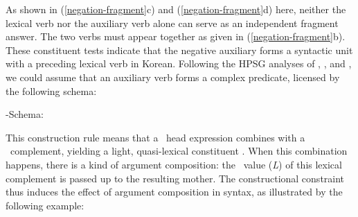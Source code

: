 \documentclass[output=paper
                ,modfonts
                ,nonflat
	        ,collection
	        ,collectionchapter
	        ,collectiontoclongg
 	        ,biblatex
                ,babelshorthands
                ,newtxmath
                ,draftmode
                ,colorlinks, citecolor=brown
]{./langsci/langscibook}
\begin{document}
{\begin{exe}
\begin{xlist}
\begin{exe}
\begin{xlist}
%
%
%
%
As shown in (\ref{negation-fragment}c) and (\ref{negation-fragment}d) here, neither the lexical verb nor the auxiliary verb alone can serve as an independent fragment answer. The two
verbs must appear together as given in (\ref{negation-fragment}b). These constituent tests
indicate that the negative auxiliary forms
a syntactic unit with a preceding lexical  verb in Korean.
Following the HPSG analyses of \citet{Bratt:96}, \citet{Chung:98}, and \citet{Kim:16},
we could assume that
an auxiliary verb forms a complex predicate, licensed by
the following schema:
%
%


\ea
\label{negation-hd-lex-cxt}
\head-\LIGHT Schema:\\
\z

\noindent   This construction rule means that a \LIGHT\ head
expression combines with a \LIGHT\ complement, yielding
a light, quasi-lexical constituent \citep{BW:13}.
When this combination happens,
there is a kind of argument composition: the \COMPS\  value (\textit{L}) of this
lexical complement is passed up to the resulting mother.
The constructional constraint thus induces the effect of argument composition in syntax,
as illustrated by the following example:


\end{xlist}
\end{exe}
\end{xlist}
\end{exe}}
\end{document}
